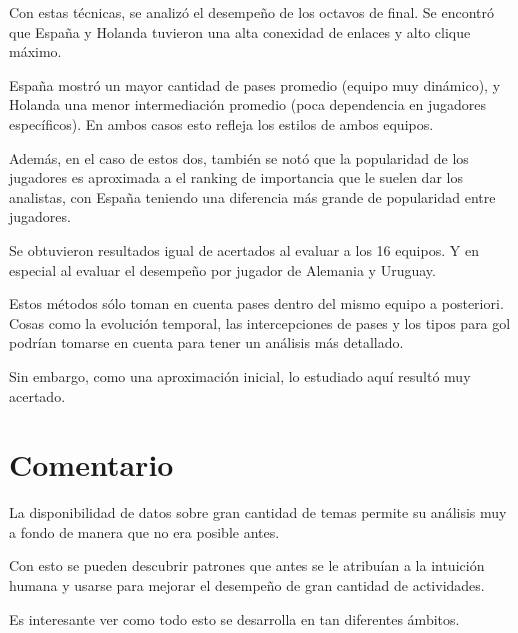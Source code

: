 \documentclass[12pt, letterpaper]{article}
\begin{document}
    Con estas técnicas, se analizó el desempeño de los octavos de final. Se 
    encontró que España y Holanda tuvieron una alta conexidad de enlaces y 
    alto clique máximo.

    España mostró un mayor cantidad de pases promedio (equipo muy dinámico), y 
    Holanda una menor intermediación promedio (poca dependencia en jugadores 
    específicos). En ambos casos esto refleja los estilos de ambos equipos.

    Además, en el caso de estos dos, también se notó que la popularidad de los 
    jugadores es aproximada a el ranking de importancia que le suelen dar los 
    analistas, con España teniendo una diferencia más grande de popularidad 
    entre jugadores.

    Se obtuvieron resultados igual de acertados al evaluar a los 16 equipos. Y 
    en especial al evaluar el desempeño por jugador de Alemania y Uruguay.

    Estos métodos sólo toman en cuenta pases dentro del mismo equipo a 
    posteriori. Cosas como la evolución temporal, las intercepciones de pases y
    los tipos para gol podrían tomarse en cuenta para tener un análisis más 
    detallado.

    Sin embargo, como una aproximación inicial, lo estudiado aquí resultó muy 
    acertado.

    \section*{Comentario}

    La disponibilidad de datos sobre gran cantidad de temas permite su análisis 
    muy a fondo de manera que no era posible antes.

    Con esto se pueden descubrir patrones que antes se le atribuían a la 
    intuición humana y usarse para mejorar el desempeño de gran cantidad de 
    actividades.

    Es interesante ver como todo esto se desarrolla en tan diferentes ámbitos.
\end{document}
